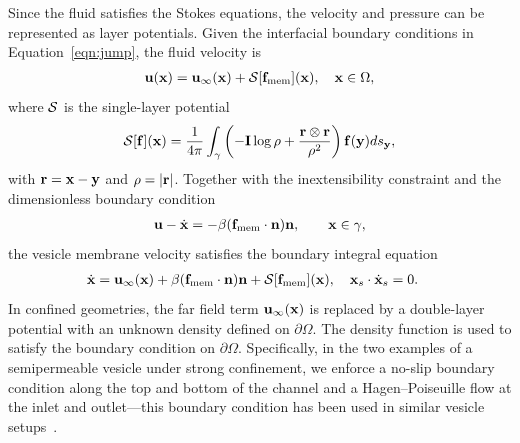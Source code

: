 \documentclass[prb,preprint,showpacs,preprintnumbers,amsmath,amssymb,longbibliography]{revtex4-1}
\begin{document}
Since the fluid satisfies the Stokes equations, the velocity and
pressure can be represented as layer potentials. Given the interfacial
boundary conditions in Equation~\eqref{eqn:jump}, the fluid velocity is
\begin{align}
  \mathbf{u}(\mathbf{x}) = \mathbf{u}_\infty(\mathbf{x}) + \mathcal{S}[\mathbf{f}_\mathrm{mem}](\mathbf{x}), \quad
    \mathbf{x} \in \Omega,
\end{align}
where $\mathcal{S}$ is the single-layer potential
\begin{align}
  \label{eqn:SLP}
  \mathcal{S}[\mathbf{f}](\mathbf{x}) = \frac{1}{4\pi} \int_{\gamma} \left(
    -\mathbf{I} \log\rho + \frac{\mathbf{r} \otimes \mathbf{r}}{\rho^2} \right)
    \mathbf{f}(\mathbf{y}) ds_{\mathbf{y}},
\end{align}
with $\mathbf{r} = \mathbf{x} - \mathbf{y}$ and $\rho = |\mathbf{r}|$. 
Together with the inextensibility constraint and the dimensionless boundary condition
\begin{align}
  \label{eqn:vesicleFlux}
  \mathbf{u} - \dot{\mathbf{x}} = - \beta (\mathbf{f}_\mathrm{mem} \cdot \mathbf{n}) \mathbf{n}, \qquad
  \mathbf{x} \in \gamma,
\end{align}
%
%
the vesicle membrane velocity satisfies the boundary integral equation
\begin{align}
  \label{eqn:vesVelocity}
  \dot{\mathbf{x}} &= \mathbf{u}_\infty(\mathbf{x}) + \beta (\mathbf{f}_\mathrm{mem}\cdot\mathbf{n})\mathbf{n}
  + \mathcal{S} [\mathbf{f}_\mathrm{mem}](\mathbf{x}),  \quad
  \mathbf{x}_s \cdot \dot{\mathbf{x}}_s = 0.
\end{align}
In confined geometries, the far field term $\mathbf{u}_\infty(\mathbf{x})$ is replaced
by a double-layer potential with an unknown density defined on
$\partial\Omega$. The density function is used to satisfy the boundary
condition on $\partial\Omega$. Specifically, in the two examples of a semipermeable vesicle under strong confinement, we enforce a
no-slip boundary condition along the top and bottom of the channel and a
Hagen–Poiseuille flow at the inlet and outlet---this boundary condition
has been used in similar vesicle setups~\cite{qua-bir2014,
rah-vee-bir2010, lu-rah-zor2017}. 
\end{document}
